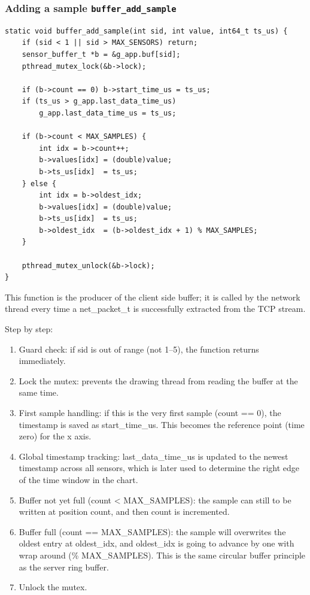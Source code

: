 \subsubsection{Adding a sample \texttt{buffer\_add\_sample}}
\begin{verbatim}
static void buffer_add_sample(int sid, int value, int64_t ts_us) {
    if (sid < 1 || sid > MAX_SENSORS) return;
    sensor_buffer_t *b = &g_app.buf[sid];
    pthread_mutex_lock(&b->lock);

    if (b->count == 0) b->start_time_us = ts_us;
    if (ts_us > g_app.last_data_time_us)
        g_app.last_data_time_us = ts_us;

    if (b->count < MAX_SAMPLES) {
        int idx = b->count++;
        b->values[idx] = (double)value;
        b->ts_us[idx]  = ts_us;
    } else {
        int idx = b->oldest_idx;
        b->values[idx] = (double)value;
        b->ts_us[idx]  = ts_us;
        b->oldest_idx  = (b->oldest_idx + 1) % MAX_SAMPLES;
    }

    pthread_mutex_unlock(&b->lock);
}
\end{verbatim}
This function is the producer of the client side buffer; it is called by the network thread every time a net\_packet\_t is successfully extracted from the TCP stream.

Step by step: 
\begin{enumerate}
\item	Guard check: if sid is out of range (not 1–5), the function returns immediately.
\item	Lock the mutex: prevents the drawing thread from reading the buffer at the same time.
\item	First sample handling: if this is the very first sample (count == 0), the timestamp is saved as start\_time\_us. This becomes the reference point (time zero) for the x axis.
\item	Global timestamp tracking: last\_data\_time\_us is updated to the newest timestamp across all sensors, which is later used to determine the right edge of the time window in the chart.
\item	Buffer not yet full (count < MAX\_SAMPLES): the sample can still to be written at position count, and then count is incremented.
\item	Buffer full (count == MAX\_SAMPLES): the sample will overwrites the oldest entry at oldest\_idx, and oldest\_idx is going to advance by one with wrap around (\% MAX\_SAMPLES). This is the same circular buffer principle as the server ring buffer.
\item	Unlock the mutex.
\end{enumerate}

